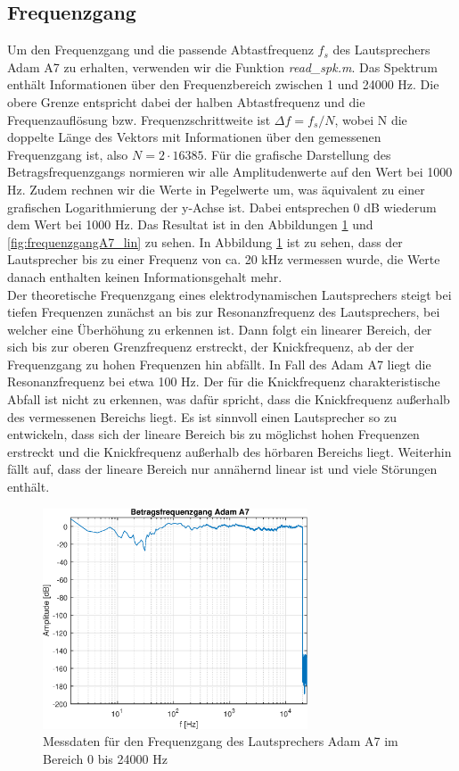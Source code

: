 \subsection{Frequenzgang}
\label{subsec:b}
Um den Frequenzgang und die passende Abtastfrequenz $f_s$ des Lautsprechers Adam A7 zu erhalten, verwenden wir die Funktion \textit{read\_spk.m}.
Das Spektrum enthält Informationen über den Frequenzbereich zwischen 1 und 24000 Hz.
Die obere Grenze entspricht dabei der halben Abtastfrequenz und die Frequenzauflösung bzw. Frequenzschrittweite ist $\Delta f = f_s / N$, wobei N die doppelte Länge des Vektors mit Informationen über den gemessenen Frequenzgang ist, also $N = 2 \cdot 16385$.
Für die grafische Darstellung des Betragsfrequenzgangs normieren wir alle Amplitudenwerte auf den Wert bei 1000 Hz.
Zudem rechnen wir die Werte in Pegelwerte um, was äquivalent zu einer grafischen Logarithmierung der y-Achse ist.
Dabei entsprechen 0 dB wiederum dem Wert bei 1000 Hz.
Das Resultat ist in den Abbildungen \ref{fig:frequenzgangA7} und \ref{fig:frequenzgangA7_lin} zu sehen. 
In Abbildung \ref{fig:frequenzgangA7} ist zu sehen, dass der Lautsprecher bis zu einer Frequenz von ca. 20 kHz vermessen wurde, die Werte danach enthalten keinen Informationsgehalt mehr.\\
Der theoretische Frequenzgang eines elektrodynamischen Lautsprechers steigt bei tiefen Frequenzen zunächst an bis zur Resonanzfrequenz des Lautsprechers, bei welcher eine Überhöhung zu erkennen ist.
Dann folgt ein linearer Bereich, der sich bis zur oberen Grenzfrequenz erstreckt, der Knickfrequenz, ab der der Frequenzgang zu hohen Frequenzen hin abfällt. 
In Fall des Adam A7 liegt die Resonanzfrequenz bei etwa 100 Hz.
Der für die Knickfrequenz charakteristische Abfall ist nicht zu erkennen, was dafür spricht, dass die Knickfrequenz außerhalb des vermessenen Bereichs liegt.
Es ist sinnvoll einen Lautsprecher so zu entwickeln, dass sich der lineare Bereich bis zu möglichst hohen Frequenzen erstreckt und die Knickfrequenz außerhalb des hörbaren Bereichs liegt.
Weiterhin fällt auf, dass der lineare Bereich nur annähernd linear ist und viele Störungen enthält.\\

\begin{figure}[H]
        \centering
        \includegraphics[width=0.7\textwidth]{Figures/frequenzgangA7.eps}
        \caption{Messdaten für den Frequenzgang des Lautsprechers Adam A7 im Bereich 0 bis 24000 Hz}
        \label{fig:frequenzgangA7}
\end{figure}

